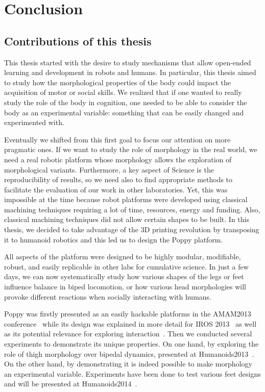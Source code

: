 
\chapter{Conclusion} %
\label{cha:conclusion}



\section{Contributions of this thesis} %
\label{sec:rappel_des_contributions}

This thesis started with the desire to study mechanisms that allow open-ended learning and development in robots and humans. In particular, this thesis aimed to study how the morphological properties of the body could impact the acquisition of motor or social skills.
We realized that if one wanted to really study the role of the body in cognition, one needed to be able to consider the body as an experimental variable: something that can be easily changed and experimented with.

Eventually we shifted from this first goal to focus our attention on more pragmatic ones. If we want to study the role of morphology in the real world, we need a real robotic platform whose morphology allows the exploration of morphological variants. Furthermore, a key aspect of Science is the reproducibility of results, so we need also to find appropriate methods to facilitate the evaluation of our work in other laboratories.
Yet, this was impossible at the time because robot platforms were developed using classical machining techniques requiring a lot of time, resources, energy and funding. Also, classical machining techniques did not allow certain shapes to be built. In this thesis, we decided to take advantage of the 3D printing revolution by transposing it to humanoid robotics and this led us to design the Poppy platform.

All aspects of the platform were designed to be highly modular, modifiable, robust, and easily replicable in other labs for cumulative science. In just a few days, we can now systematically study how various shapes of the legs or feet influence balance in biped locomotion, or how various head morphologies will provoke different reactions when socially interacting with humans.

Poppy was firstly presented as an easily hackable platforms in the AMAM2013 conference~\parencite{lapeyre:hal-00788433} while its design was explained in more detail for IROS 2013~\parencite{lapeyre:hal-00852858} as well as its potential relevance for exploring interaction~\parencite{lapeyre:hal-00984312}. Then we conducted several experiments to demonstrate its unique properties. On one hand, by exploring the role of thigh morphology over bipedal dynamics, presented at Humanoids2013~\parencite{lapeyre:hal-00861110}. On the other hand, by demonstrating it is indeed possible to make morphology an experimental variable. Experiments have been done to test various feet designs and will be presented at Humanoids2014~\parencite{lapeyre2014humanoids}.

